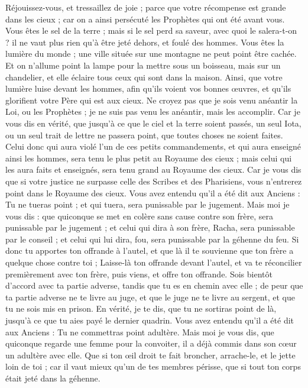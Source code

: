 \begin{multicols}{2}
Réjouissez-vous, et tressaillez de joie ; parce que votre récompense est grande dans les cieux ; car on a ainsi persécuté les Prophètes qui ont été avant vous.
Vous êtes le sel de la terre ; mais si le sel perd sa saveur, avec quoi le salera-t-on ? il ne vaut plus rien qu'à être jeté dehors, et foulé des hommes.
Vous êtes la lumière du monde ; une ville située sur une montagne ne peut point être cachée.
Et on n'allume point la lampe pour la mettre sous un boisseau, mais sur un chandelier, et elle éclaire tous ceux qui sont dans la maison.
Ainsi, que votre lumière luise devant les hommes, afin qu'ils voient vos bonnes œuvres, et qu'ils glorifient votre Père qui est aux cieux.
Ne croyez pas que je sois venu anéantir la Loi, ou les Prophètes ; je ne suis pas venu les anéantir, mais les accomplir.
Car je vous dis en vérité, que jusqu'à ce que le ciel et la terre soient passés, un seul Iota, ou un seul trait de lettre ne passera point, que toutes choses ne soient faites.
Celui donc qui aura violé l'un de ces petits commandements, et qui aura enseigné ainsi les hommes, sera tenu le plus petit au Royaume des cieux ; mais celui qui les aura faits et enseignés, sera tenu grand au Royaume des cieux.
Car je vous dis que si votre justice ne surpasse celle des Scribes et des Pharisiens, vous n'entrerez point dans le Royaume des cieux.
Vous avez entendu qu'il a été dit aux Anciens : Tu ne tueras point ; et qui tuera, sera punissable par le jugement.
Mais moi je vous dis : que quiconque se met en colère sans cause contre son frère, sera punissable par le jugement ; et celui qui dira à son frère, Racha, sera punissable par le conseil ; et celui qui lui dira, fou, sera punissable par la géhenne du feu.
Si donc tu apportes ton offrande à l'autel, et que là il te souvienne que ton frère a quelque chose contre toi ;
Laisse-là ton offrande devant l'autel, et va te réconcilier premièrement avec ton frère, puis viens, et offre ton offrande.
Sois bientôt d'accord avec ta partie adverse, tandis que tu es en chemin avec elle ; de peur que ta partie adverse ne te livre au juge, et que le juge ne te livre au sergent, et que tu ne sois mis en prison.
En vérité, je te dis, que tu ne sortiras point de là, jusqu'à ce que tu aies payé le dernier quadrin.
Vous avez entendu qu'il a été dit aux Anciens : Tu ne commettras point adultère.
Mais moi je vous dis, que quiconque regarde une femme pour la convoiter, il a déjà commis dans son cœur un adultère avec elle.
Que si ton œil droit te fait broncher, arrache-le, et le jette loin de toi ; car il vaut mieux qu'un de tes membres périsse, que si tout ton corps était jeté dans la géhenne.

\end{multicols}
